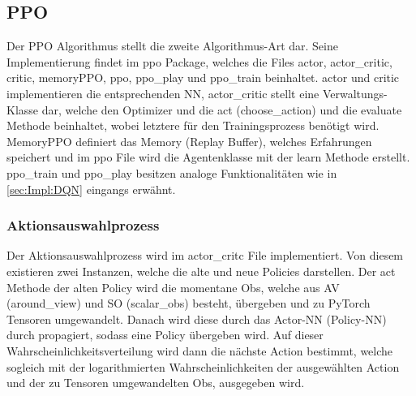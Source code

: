 \subsection{PPO}
Der PPO Algorithmus stellt die zweite Algorithmus-Art dar. Seine Implementierung findet im ppo Package, welches die Files actor, actor\_critic, critic, memoryPPO, ppo, ppo\_play und ppo\_train beinhaltet. actor und critic implementieren die entsprechenden NN, actor\_critic stellt eine Verwaltungs-Klasse dar, welche den Optimizer und die act (choose\_action) und die evaluate Methode beinhaltet, wobei letztere für den Trainingsprozess benötigt wird. MemoryPPO definiert das Memory (Replay Buffer), welches Erfahrungen speichert und im ppo File wird die Agentenklasse mit der learn Methode erstellt. ppo\_train und ppo\_play besitzen analoge Funktionalitäten wie in \ref{sec:Impl:DQN} eingangs erwähnt.

\subsubsection{Aktionsauswahlprozess} \label{sec:Impl_PPO_Aktionsauswahlprozess}
Der Aktionsauswahlprozess wird im actor\_critc File implementiert. Von diesem existieren zwei Instanzen, welche die alte und neue Policies darstellen. Der act Methode der alten Policy wird die momentane Obs, welche aus AV (around\_view) und SO (scalar\_obs) besteht, übergeben und zu PyTorch Tensoren umgewandelt. Danach wird diese durch das Actor-NN (Policy-NN) durch propagiert, sodass eine Policy übergeben wird. Auf dieser Wahrscheinlichkeitsverteilung wird dann die nächste Action bestimmt, welche sogleich mit der logarithmierten Wahrscheinlichkeiten der ausgewählten Action und der zu Tensoren umgewandelten Obs, ausgegeben wird.


